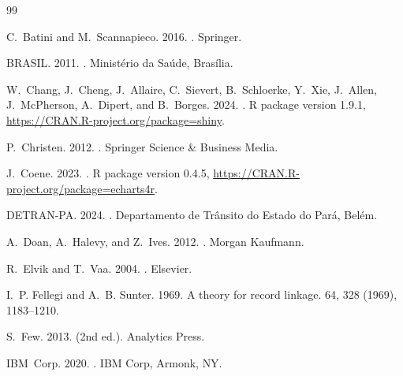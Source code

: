 \documentclass[sigconf, nonacm, screen, language=portuguese, language=spanish, language={main=english}]{acmart}
\begin{document}

\begin{thebibliography}{99}

C.~Batini and M.~Scannapieco. 2016.
.
\newblock Springer.

BRASIL. 2011.
.
\newblock Ministério da Saúde, Brasília.

W.~Chang, J.~Cheng, J.~Allaire, C.~Sievert, B.~Schloerke, Y.~Xie, J.~Allen, J.~McPherson, A.~Dipert, and B.~Borges. 2024.
.
\newblock R package version 1.9.1, \url{https://CRAN.R-project.org/package=shiny}.

P.~Christen. 2012.
.
\newblock Springer Science \& Business Media.

J.~Coene. 2023.
.
\newblock R package version 0.4.5, \url{https://CRAN.R-project.org/package=echarts4r}.

DETRAN-PA. 2024.
.
\newblock Departamento de Trânsito do Estado do Pará, Belém.

A.~Doan, A.~Halevy, and Z.~Ives. 2012.
.
\newblock Morgan Kaufmann.

R.~Elvik and T.~Vaa. 2004.
.
\newblock Elsevier.

I.~P. Fellegi and A.~B. Sunter. 1969.
\newblock A theory for record linkage.
 64, 328 (1969), 1183--1210.

S.~Few. 2013.
 (2nd ed.).
\newblock Analytics Press.

IBM~Corp. 2020.
.
\newblock IBM Corp, Armonk, NY.


\end{thebibliography}
\end{document}
